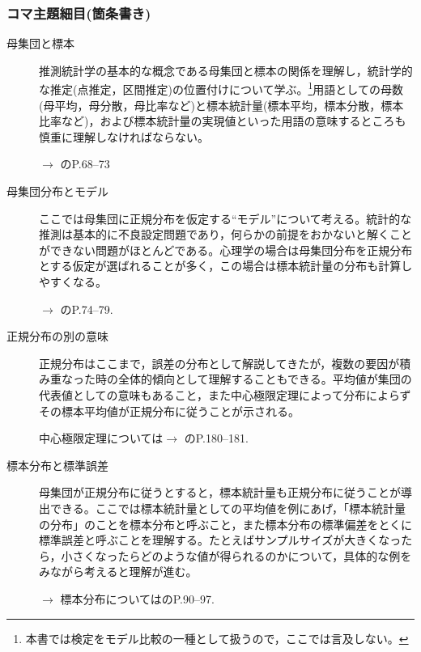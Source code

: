 \subsubsection{コマ主題細目(箇条書き)}
\begin{description}
	\item[母集団と標本]推測統計学の基本的な概念である母集団と標本の関係を理解し，統計学的な推定(点推定，区間推定)の位置付けについて学ぶ。\footnote{本書では検定をモデル比較の一種として扱うので，ここでは言及しない。}用語としての母数(母平均，母分散，母比率など)と標本統計量(標本平均，標本分散，標本比率など)，および標本統計量の実現値といった用語の意味するところも慎重に理解しなければならない。
	      \begin{flushright}
		      $\to$ \citet{Yamada2004}のP.68--73
	      \end{flushright}

	\item[母集団分布とモデル]ここでは母集団に正規分布を仮定する``モデル''について考える。統計的な推測は基本的に不良設定問題であり，何らかの前提をおかないと解くことができない問題がほとんどである。心理学の場合は母集団分布を正規分布とする仮定が選ばれることが多く，この場合は標本統計量の分布も計算しやすくなる。
	      \begin{flushright}
		      $\to$ \citet{Yamada2004}のP.74--79.
	      \end{flushright}

	\item[正規分布の別の意味]正規分布はここまで，誤差の分布として解説してきたが，複数の要因が積み重なった時の全体的傾向として理解することもできる。平均値が集団の代表値としての意味もあること，また中心極限定理によって分布によらずその標本平均値が正規分布に従うことが示される。
	      \begin{flushright}
		      中心極限定理については$\to$ \citet{Minamoto2015}のP.180--181.
	      \end{flushright}

	\item[標本分布と標準誤差]母集団が正規分布に従うとすると，標本統計量も正規分布に従うことが導出できる。ここでは標本統計量としての平均値を例にあげ，「標本統計量の分布」のことを標本分布と呼ぶこと，また標本分布の標準偏差をとくに標準誤差と呼ぶことを理解する。たとえばサンプルサイズが大きくなったら，小さくなったらどのような値が得られるのかについて，具体的な例をみながら考えると理解が進む。
	      \begin{flushright}
		      $\to$ 標本分布については\citet{Yamada2004}のP.90--97.
	      \end{flushright}

\end{description}
